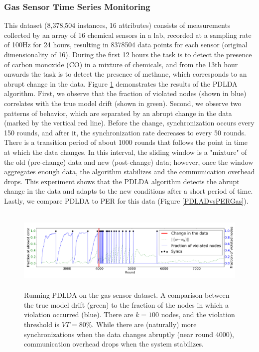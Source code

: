 \subsubsection{Gas Sensor Time Series Monitoring} 
%
This dataset \cite{fonollosa2015reservoir}  (8,378,504 instances, 16 attributes) consists of measurements collected
by an array of 16 chemical sensors in a lab, recorded at a sampling
rate of 100Hz for 24 hours, resulting in 8378504 data points for each sensor (original dimensionality of 16).
During the first 12 hours the task is to detect the presence of carbon monoxide
(CO) in a mixture of chemicals, and from the 13th hour onwards the task is to detect the presence of methane, 
which corresponds to an abrupt change in the data.
Figure \ref{BigGasOverTime} demonstrates the results of the PDLDA algorithm.
First, we observe that the fraction of violated nodes (shown in blue) correlates with the true model drift (shown in green). Second, we observe two patterns of behavior, which are separated by an abrupt change in the data  (marked by the vertical red line). Before the change,  synchronization occurs every 150 rounds, and after it, 
the synchronization rate decreases to every 50 rounds. There is a transition period of about 1000 rounds that follows the point in time at which the data changes. In this interval, the sliding window is a "mixture" of the old (pre-change) data and new (post-change) data; however, once the window aggregates enough data, the algorithm stabilizes and the communication overhead drops. This experiment shows that the PDLDA algorithm detects the abrupt change in the data and adapts to the new conditions after a short period of time.
Lastly, we compare PDLDA to PER for this data (Figure \ref{PDLADvsPERGas}).

\begin{figure}[t]
\centering
  \includegraphics[width=\textwidth, height=40mm]{graphics/overTime100k.png}%
  \caption{Running PDLDA on the gas sensor dataset.
    A comparison between the true model drift (green) to the fraction of the nodes in
    which a violation occurred  (blue).
    There are $k=100$ nodes, and the violation threshold is
    $VT=80\%$. While there are (naturally) more synchronizations when the data
    changes abruptly (near round 4000), communication overhead drops when the
    system stabilizes.}
    \label{BigGasOverTime}%
\end{figure}

